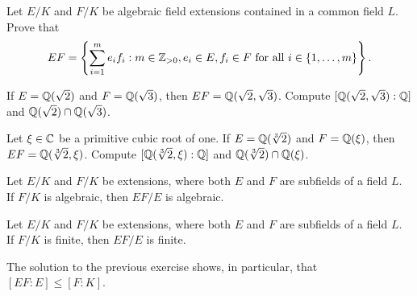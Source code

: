 \begin{exercise}
\label{xca:composite generated by products}
    Let $E/K$ and $F/K$ be algebraic field extensions contained in a common field $L$.  
    Prove that 
    \[
    EF=\left\{\sum_{i=1}^me_if_i:m\in\mathbb{Z}_{>0},e_i\in E,f_i\in F\text{ for all $i\in\{1,\dots,m\}$}\right\}.
    \]
\end{exercise}

\begin{exercise}
\label{xca:sqrt(2),sqrt(3)}
    If $E=\mathbb{Q}(\sqrt{2})$ and $F=\mathbb{Q}(\sqrt{3})$, then $EF=\mathbb{Q}(\sqrt{2},\sqrt{3})$. 
    Compute $[\mathbb{Q}(\sqrt{2},\sqrt{3}):\mathbb{Q}]$ and 
    $\mathbb{Q}(\sqrt{2})\cap\mathbb{Q}(\sqrt{3})$. 
\end{exercise}

\begin{exercise}
\label{xca:sqrt[3]2,3rd root of 1}
    Let $\xi\in\mathbb{C}$ be a primitive cubic root of one. 
    If $E=\mathbb{Q}(\sqrt[3]{2})$ and $F=\mathbb{Q}(\xi)$, then $EF=\mathbb{Q}(\sqrt[3]{2},\xi)$. 
    Compute $[\mathbb{Q}(\sqrt[3]{2},\xi):\mathbb{Q}]$ and 
    $\mathbb{Q}(\sqrt[3]{2})\cap\mathbb{Q}(\xi)$. 
\end{exercise}

\begin{exercise}
\label{xca: shift for algebraic}
	Let $E/K$ and $F/K$ be extensions, where both $E$ and $F$ are subfields of 
	a field $L$. If $F/K$ is algebraic, then $EF/E$ is algebraic.
\end{exercise}


\begin{exercise}
\label{xca: shift for finite}
	Let $E/K$ and $F/K$ be extensions, where both $E$ and $F$ are subfields of 
	a field $L$. If $F/K$ is finite, then $EF/E$ is finite.
\end{exercise}

The solution to the previous exercise shows, in particular, that $[EF:E]\leq [F:K]$. 
